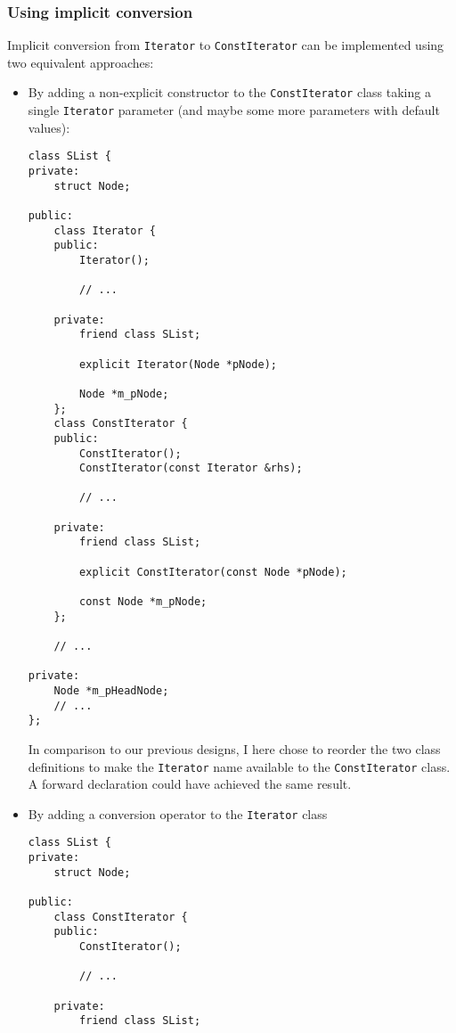 \subsubsection{Using implicit conversion}
Implicit conversion from \lstinline!Iterator! to \lstinline!ConstIterator! can be implemented using two equivalent approaches:
\begin{itemize}
\item By adding a non-explicit constructor to the \lstinline!ConstIterator! class taking a single \lstinline!Iterator! parameter (and maybe some more parameters with default values):
\begin{lstlisting}[frame=single, caption={SList.h}]
class SList {
private:
    struct Node;

public:
    class Iterator {
    public:
        Iterator();
        
        // ...
        
    private:
        friend class SList;
    
        explicit Iterator(Node *pNode);
        
        Node *m_pNode;
    };
    class ConstIterator {
    public:
        ConstIterator();
        ConstIterator(const Iterator &rhs);
                
        // ...
        
    private:
        friend class SList;
        
        explicit ConstIterator(const Node *pNode);
        
        const Node *m_pNode;
    };
    
    // ...

private:
    Node *m_pHeadNode;
    // ...
};
\end{lstlisting}
In comparison to our previous designs, I here chose to reorder the two class definitions to make the \lstinline!Iterator! name available to the \lstinline!ConstIterator! class. A forward declaration could have achieved the same result.

\item By adding a conversion operator to the \lstinline!Iterator! class
\begin{lstlisting}[frame=single, caption={SList.h}]
class SList {
private:
    struct Node;

public:
    class ConstIterator {
    public:
        ConstIterator();
                
        // ...
        
    private:
        friend class SList;
        

\end{lstlisting}
\end{itemize}
